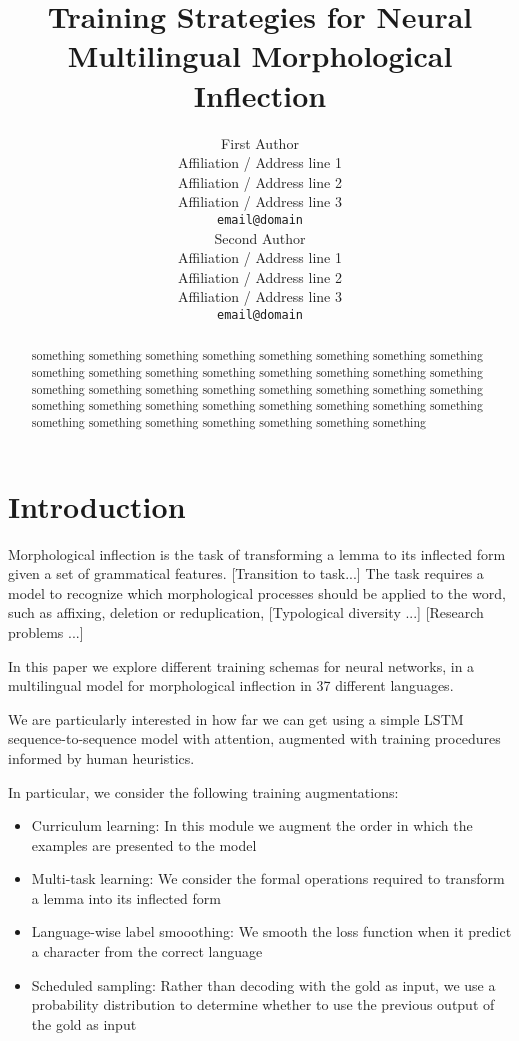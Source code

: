 \documentclass[11pt,a4paper]{article}
\title{Training Strategies for Neural Multilingual Morphological Inflection}
\author{First Author \\
  Affiliation / Address line 1 \\
  Affiliation / Address line 2 \\
  Affiliation / Address line 3 \\
  \texttt{email@domain} \\\And
  Second Author \\
  Affiliation / Address line 1 \\
  Affiliation / Address line 2 \\
  Affiliation / Address line 3 \\
  \texttt{email@domain} \\}
\date{}
\begin{document}
\maketitle
\begin{abstract}
something something something something something something
something something something something something something
something something something something something something
something something something something something something
something something something something something something
something something something something something something
something something something 
\end{abstract}

\section{Introduction}

Morphological inflection is the task of transforming a lemma to its
inflected form given a set of grammatical features. 
[Transition to task...]
The task requires a model to recognize which morphological processes
should be applied to the word, such as affixing, deletion or
reduplication, 
[Typological diversity ...]
[Research problems ...]

In this paper we explore different training schemas for neural
networks, in a multilingual model for morphological inflection in 37
different languages.

We are particularly interested in how far we can get using a simple
LSTM sequence-to-sequence model with attention, augmented with
training procedures informed by human heuristics.

In particular, we consider the following training augmentations:

\begin{itemize}
\item Curriculum learning: In this module we augment the order in which the examples are presented to the model
\item Multi-task learning: We consider the formal operations required to transform a lemma into its inflected form
\item Language-wise label smooothing: We smooth the loss function when it predict a character from the correct language
\item Scheduled sampling: Rather than decoding with the gold as input, we use a probability distribution to determine whether to use the previous output of the gold as input
\end{itemize}
\end{document}
